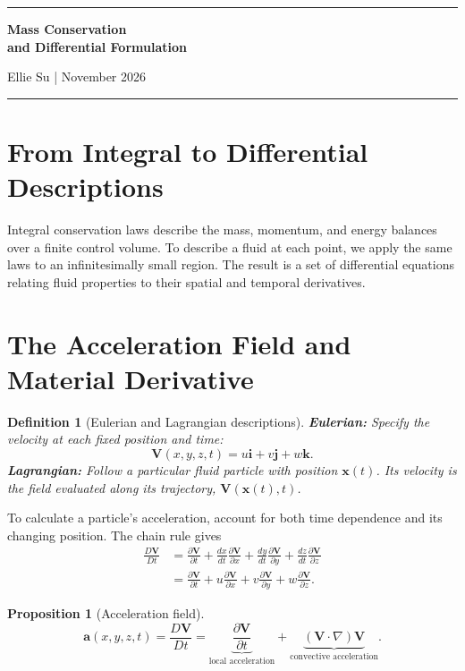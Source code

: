 \documentclass[11pt]{article}
\author{Ellie Su}
\theoremstyle{plaincolon}
\newtheorem{proposition}[theorem]{Proposition}
\theoremstyle{definitioncolon}
\newtheorem{definition}[theorem]{Definition}
\theoremstyle{remarkcolon}
\newcommand{\settitle}[2]{%
    \thispagestyle{fancy}
    \begingroup
    \centering
    \vspace*{-0.65cm}
    {\color{deepblue}\rule{0.72\textwidth}{1.1pt}\par}
    \vspace{0.35cm}
    {\fontsize{30}{34}\selectfont\bfseries\color{deepblue}#1\par}
    \vspace{0.2cm}
    {\small\color{grayborder}#2\par}
    \vspace{0.35cm}
    {\color{deepblue}\rule{0.72\textwidth}{0.7pt}\par}
    \vspace{0.5cm}
    \endgroup
}
\numberwithin{equation}{section}
\begin{document}
\settitle{Mass Conservation\\and Differential Formulation}{Ellie Su \quad | \quad November 2026}

\section{From Integral to Differential Descriptions}

Integral conservation laws describe the mass, momentum, and energy balances over a finite control volume. To describe a fluid at each point, we apply the same laws to an infinitesimally small region. The result is a set of differential equations relating fluid properties to their spatial and temporal derivatives.

\section{The Acceleration Field and Material Derivative}

\begin{definition}[Eulerian and Lagrangian descriptions]
\textbf{Eulerian:} Specify the velocity at each fixed position and time:
\[
\mathbf V(x,y,z,t)=u\mathbf i+v\mathbf j+w\mathbf k.
\]
\textbf{Lagrangian:} Follow a particular fluid particle with position $\mathbf x(t)$. Its velocity is the field evaluated along its trajectory, $\mathbf V(\mathbf x(t),t)$.
\end{definition}

To calculate a particle's acceleration, account for both time dependence and its changing position. The chain rule gives
\begin{align*}
\frac{D\mathbf V}{Dt}
&=\frac{\partial\mathbf V}{\partial t}
+\frac{dx}{dt}\frac{\partial\mathbf V}{\partial x}
+\frac{dy}{dt}\frac{\partial\mathbf V}{\partial y}
+\frac{dz}{dt}\frac{\partial\mathbf V}{\partial z}\\
&=\frac{\partial\mathbf V}{\partial t}
+u\frac{\partial\mathbf V}{\partial x}
+v\frac{\partial\mathbf V}{\partial y}
+w\frac{\partial\mathbf V}{\partial z}.
\end{align*}

\begin{proposition}[Acceleration field]
\[
\mathbf a(x,y,z,t)=\frac{D\mathbf V}{Dt}
=\underbrace{\frac{\partial\mathbf V}{\partial t}}_{\text{local acceleration}}
+\underbrace{(\mathbf V\cdot\nabla)\mathbf V}_{\text{convective acceleration}}.
\]
\end{proposition}
\end{document}
